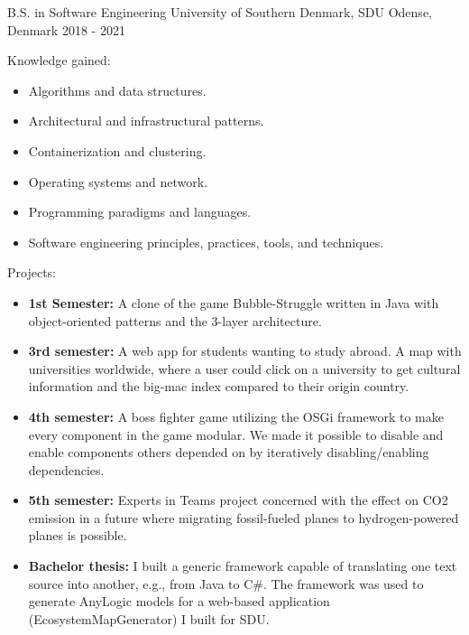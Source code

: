 \begin{cventries}
\cventry
{B.S. in Software Engineering} %
{University of Southern Denmark, SDU} %
{Odense, Denmark} %
{2018 - 2021} %
{
  \begin{cvitems} %
    \item {Knowledge gained: }
    \begin{itemize} %
      \item {Algorithms and data structures.}
      \item {Architectural and infrastructural patterns.}
      \item {Containerization and clustering.}
      \item {Operating systems and network.}
      \item {Programming paradigms and languages.}
      \item {Software engineering principles, practices, tools, and techniques.}
    \end{itemize}
    \item {Projects: }
    \begin{itemize} %
      \item {\textbf{1st Semester:} A clone of the game Bubble-Struggle written in Java with object-oriented patterns and the 3-layer architecture.}
      \item {\textbf{3rd semester:} A web app for students wanting to study abroad. A map with universities worldwide, where a user could click on a university to get cultural information and the big-mac index compared to their origin country.}
      \item {\textbf{4th semester:} A boss fighter game utilizing the OSGi framework to make every component in the game modular. We made it possible to disable and enable components others depended on by iteratively disabling/enabling dependencies.}
      \item {\textbf{5th semester:} Experts in Teams project concerned with the effect on CO2 emission in a future where migrating fossil-fueled planes to hydrogen-powered planes is possible. }
      \item {\textbf{Bachelor thesis:} I built a generic framework capable of translating one text source into another, e.g., from Java to C\#. The framework was used to generate AnyLogic models for a web-based application (EcosystemMapGenerator) I built for SDU.}
    \end{itemize}
  \end{cvitems}
}


\end{cventries}
